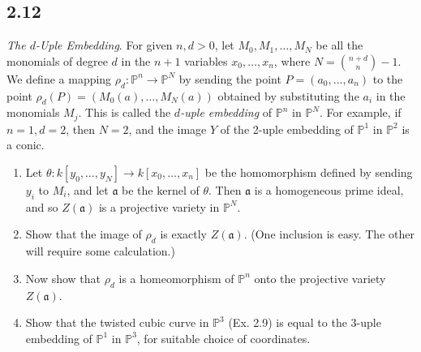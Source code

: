     \subsection*{2.12}
	{\em The $d$-{\rm Uple} Embedding}.  For given $n, d >0$, let $M_0, M_1, \ldots, M_N$ be all the monomials of degree $d$ in the $n+1$ variables $x_0, \ldots, x_n$, where $N = {n+d \choose n} - 1$.  We define a mapping $\rho_d \colon \mathbb{P}^n \to \mathbb{P}^N$ by sending the point $P = (a_0, \ldots, a_n)$ to the point $\rho_d(P) = (M_0(a), \ldots, M_N(a))$ obtained by substituting the $a_i$ in the monomials $M_j$.  This is called the {\em $d$-{\rm uple} embedding} of $\mathbb{P}^n$ in $\mathbb{P}^N$.  For example, if $n=1,d=2$, then $N=2$, and the image $Y$ of the 2-uple embedding of $\mathbb{P}^1$ in $\mathbb{P}^2$ is a conic.

\begin{enumerate}
	\item  Let $\theta \colon k[y_0, \ldots, y_N] \to k[x_0, \ldots, x_n]$ be the homomorphism defined by sending $y_i$ to $M_i$, and let $\mathfrak{a}$ be the kernel of $\theta$.  Then $\mathfrak{a}$ is a homogeneous prime ideal, and so $Z(\mathfrak{a})$ is a projective variety in $\mathbb{P}^N$.
	\item Show that the image of $\rho_d$ is exactly $Z(\mathfrak{a})$.  (One inclusion is easy.  The other will require some calculation.)
	\item Now show that $\rho_d$ is a homeomorphism of $\mathbb{P}^n$ onto the projective variety $Z(\mathfrak{a})$.
	\item Show  that the twisted cubic curve in $\mathbb{P}^3$ (Ex. 2.9) is equal to the 3-uple embedding of $\mathbb{P}^1$ in $\mathbb{P}^3$, for suitable choice of coordinates.
\end{enumerate}